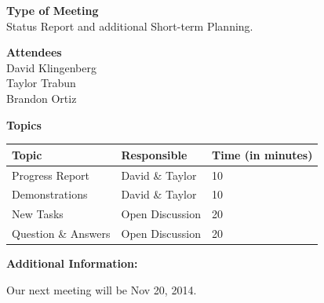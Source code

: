\documentclass[pdftex,11pt]{article}
\begin{document}
{ \large \bfseries \hspace*{2 mm} Type of Meeting\\}
\hspace*{12 mm}  Status Report and additional Short-term Planning.
\vspace*{1.5mm}

{ \large \bfseries \hspace*{2 mm} Attendees\\}
\hspace*{12mm} David Klingenberg\\
\hspace*{12mm} Taylor Trabun\\
\hspace*{12mm} Brandon Ortiz\\
\vspace*{1.5mm}

{ \large \bfseries \noindent Topics}
\vspace*{2.5mm}

\begin{tabular}{| l | l | l |}
  \hline
  \bfseries Topic & \bfseries Responsible & \bfseries Time (in minutes) \\ \hline
  Progress Report  & David \& Taylor &  10 \\ \hline
  Demonstrations & David \& Taylor & 10 \\ \hline
  New Tasks & Open Discussion & 20 \\ \hline
  Question \&  Answers  & Open Discussion & 20 \\ 
  \hline
\end{tabular}

\vspace*{2.5mm}
{ \large \bfseries \noindent Additional Information:}

Our next meeting will be Nov 20, 2014.
\end{document}
